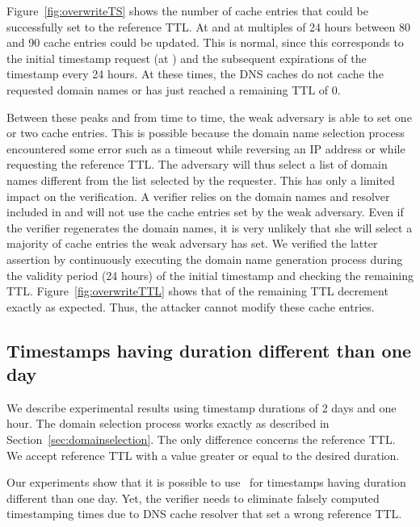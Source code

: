 Figure~\ref{fig:overwriteTS} shows the number of cache entries that could be successfully set to the reference TTL. At  and at multiples of 24 hours between 80 and 90 cache entries could be updated. This is normal, since this corresponds to the initial timestamp request (at ) and the subsequent expirations of the timestamp every 24 hours. At these times, the DNS caches do not cache the requested domain names or has just reached a remaining TTL of 0.

Between these peaks and from time to time, the weak adversary is able to set one or two cache entries. This is possible because the domain name selection process encountered some error such as a timeout while reversing an IP address or while requesting the reference TTL. The adversary will thus select a list of domain names different from the list selected by the requester.
This has only a limited impact on the verification. A verifier relies on the domain names and resolver included in  and will not use the cache entries set by the weak adversary. Even if the verifier regenerates the domain names, it is very unlikely that she will select a majority of cache entries the weak adversary has set.
We verified the latter assertion by continuously executing the domain name generation process during the validity period (24 hours) of the initial timestamp and checking the remaining TTL.
Figure~\ref{fig:overwriteTTL} shows that  of the remaining TTL decrement exactly as expected. Thus, the attacker cannot modify these cache entries.






\subsection{Timestamps having duration different than one day}
\label{sec:moredays}





We describe experimental results using timestamp durations of 2 days and one hour.
The domain selection process works exactly as described in Section~\ref{sec:domainselection}. The only difference concerns the reference TTL. We accept reference TTL with a value greater or equal to the desired duration.

Our experiments show that it is possible to use \DNStamp\ for timestamps having duration different than one day. Yet, the verifier needs to eliminate falsely computed timestamping times due to DNS cache resolver that set a wrong reference TTL.


